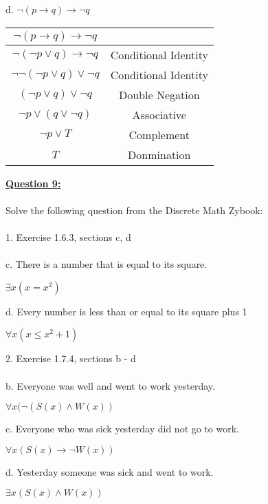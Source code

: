 \documentclass[11pt]{article}
\begin{document}
{\begin{center}
\begin{tabular}{ |c|c| }
\end{tabular}
\end{center}   
d. ${\displaystyle \neg} (p \rightarrow q) \rightarrow {\displaystyle \neg} q $\\
\begin{center}
\begin{tabular}{ |c|c| } 
 \hline
${\displaystyle \neg} (p \rightarrow q) \rightarrow {\displaystyle \neg} q $ & \space \\
 \hline
${\displaystyle \neg} ({\displaystyle \neg} p \vee q) \rightarrow {\displaystyle \neg} q $ & Conditional Identity\\
 \hline
 ${\displaystyle \neg} {\displaystyle \neg}({\displaystyle \neg} p \vee q) \vee {\displaystyle \neg} q$ & Conditional Identity \\
 \hline
 $({\displaystyle \neg} p \vee q) \vee {\displaystyle \neg} q$ & Double Negation \\
\hline
 ${\displaystyle \neg} p \vee (q \vee {\displaystyle \neg} q)$& Associative\\
\hline
 ${\displaystyle \neg} p \vee T $ & Complement\\
 \hline
$ T $ & Donmination\\
 \hline

\end{tabular}
\end{center}   
\pagebreak

\noindent \textbf{\ul{Question 9:}} \\
\\
Solve the following question from the Discrete Math Zybook:\\\\
1. Exercise 1.6.3, sections c, d \\\\
c. There is a number that is equal to its square.\\
\begin{center}
$\exists x(x = x^2)$
\end{center}
d. Every number is less than or equal to its square plus 1\\
\begin{center}
$\forall x(x \leq x^2 + 1)$
\end{center}
2. Exercise 1.7.4, sections b - d \\\\
b. Everyone was well and went to work yesterday. \\
\begin{center}
$ \forall x({\displaystyle \neg} (S(x) \wedge W(x))$
\end{center}
c. Everyone who was sick yesterday did not go to work.\\
\begin{center}
$ \forall x(S(x) \rightarrow {\displaystyle \neg} W(x))$
\end{center}
d. Yesterday someone was sick and went to work. \\
\begin{center}
$ \exists x(S(x) \wedge W(x))$
\end{center}
\pagebreak

}
\end{document}
